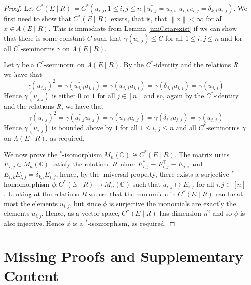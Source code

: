 \documentclass{article}
\theoremstyle{plain}
\theoremstyle{definition}
\theoremstyle{remark}
\newcommand{\norm}[1]{\left\lVert#1\right\rVert}
\begin{document}
\begin{proof}
	Let $C^*(E \mid R) \coloneqq C^*(u_{i,j}, 1 \leq i,j \leq n \mid
		u_{i,j}^* = u_{j,i},
		u_{i,k}u_{l,j} = \delta_{k,l}u_{i,j}
		)$.
	We first need to show that $C^*(E \mid R)$ exists, that is, 
	that $\norm{x} < \infty$ for all $x \in A(E \mid R)$.
	This is immediate from
	Lemma \ref{uniCstarexist}
	if we can show that there is some constant $C$
	such that $\gamma(u_{i,j}) \leq C$ for all $1 \leq i,j \leq n$ and for all
	$C^*$-seminorms $\gamma$ on $A(E \mid R)$.

	Let $\gamma$ be a $C^*$-seminorm on $A(E \mid R)$.
	By the $C^*$-identity and the relations $R$ we have that
	\begin{equation}
		\gamma(u_{j,j})^2 
		= 
		\gamma(u_{j,j}^*u_{j,j})
		=
		\gamma(u_{j,j}u_{j,j})
		=
		\gamma(\delta_{j,j}u_{j,j})
		=
		\gamma(u_{j,j})
	\end{equation}
	Hence $\gamma({u_{j,j}})$ is either $0$ or $1$ for all $j \in [n]$ and so,
	again by the $C^*$-identity and the relations $R$, we have that
	\begin{equation}
		\gamma(u_{i,j})^2
		=
		\gamma(u_{i,j}^*u_{i,j})
		=
		\gamma(u_{j,i}u_{i,j})
		=
		\gamma(\delta_{i,i}u_{j,j})
		=
		\gamma(u_{j,j})
	\end{equation}
	Hence $\gamma({u_{i,j}})$ is bounded above by $1$ for all $1 \leq i,j \leq n$
	and all $C^*$-seminorms $\gamma$ on $A(E \mid R)$, as required.

	We now prove the $^*$-isomorphism $M_n(\mathbb{C}) \cong C^*(E \mid R)$.
	The matrix units $E_{i,j} \in M_n(\mathbb{C})$
	satisfy the relations $R$, since $E_{i,j}^* = E_{i,j}^\top = E_{j,i}$
	and $E_{i,k}E_{l,j} = \delta_{k,l}E_{i,j}$, hence, by the universal property,
	there exists a surjective $^*$-homomorphism 
	$\phi: C^*(E \mid R) \rightarrow M_n(\mathbb{C})$ such that 
	$u_{i,j} \mapsto E_{i,j}$ for all $i,j \in [n]$.
	Looking at the relations $R$ we see that the monomials in $C^*(E \mid R)$
	can be at most the elements $u_{i,j}$, but since $\phi$ is surjective
	the monomials are exactly the elements $u_{i,j}$. Hence, as a vector space,
	$C^*(E \mid R)$ has dimension $n^2$ and so $\phi$ is also injective.
	Hence $\phi$ is a $^*$-isomorphism, as required.
\end{proof}


\section{Missing Proofs and Supplementary Content} \label{missingproofs}
\end{document}
